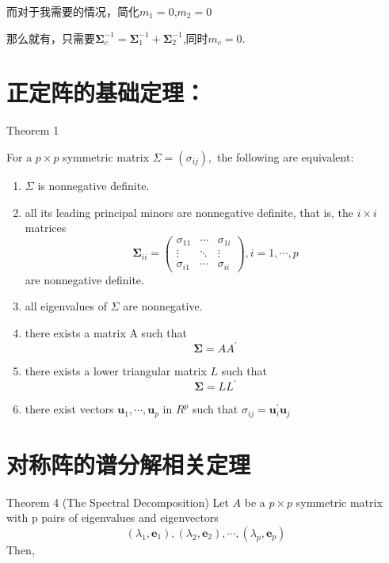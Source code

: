 \documentclass[
]{book}
\theoremstyle{definition}
\theoremstyle{definition}
\theoremstyle{definition}
\theoremstyle{remark}
\begin{document}
而对于我需要的情况，简化\(m_1=0\),\(m_2=0\)

那么就有，只需要\(\mathbf{\Sigma}_{c}^{-1}=\mathbf{\Sigma}_{1}^{-1}+\mathbf{\Sigma}_{2}^{-1}\),同时\(m_c=0\).

\hypertarget{ux6b63ux5b9aux9635ux7684ux57faux7840ux5b9aux7406}{%
\section{正定阵的基础定理：}\label{ux6b63ux5b9aux9635ux7684ux57faux7840ux5b9aux7406}}

Theorem 1

For a \(p \times p\) symmetric matrix \(\Sigma=\left(\sigma_{i j}\right),\) the following are equivalent:

\begin{enumerate}
\def\labelenumi{(\alph{enumi})}
\item
  \(\Sigma\) is nonnegative definite.
\item
  all its leading principal minors are nonnegative definite, that is, the \(i \times i\) matrices
  \[
  \boldsymbol{\Sigma}_{i i}=\left(\begin{array}{ccc}
  {\sigma_{11}} & {\cdots} & {\sigma_{1 i}} \\
  {\vdots} & {\ddots} & {\vdots} \\
  {\sigma_{i 1}} & {\cdots} & {\sigma_{i i}}
  \end{array}\right), i=1, \cdots, p
  \]
  are nonnegative definite.
\item
  all eigenvalues of \(\Sigma\) are nonnegative.
\item
  there exists a matrix A such that
  \[
  \boldsymbol{\Sigma}=A A^{\prime}
  \]
\item
  there exists a lower triangular matrix \(L\) such that
  \[
  \boldsymbol{\Sigma}=L L^{\prime}
  \]
\item
  there exist vectors \(\boldsymbol{u}_{1}, \cdots, \boldsymbol{u}_{p}\) in \(R^{p}\) such that \(\sigma_{i j}=\boldsymbol{u}_{i}^{\prime} \boldsymbol{u}_{j}\)
\end{enumerate}

\hypertarget{ux5bf9ux79f0ux9635ux7684ux8c31ux5206ux89e3ux76f8ux5173ux5b9aux7406}{%
\section{对称阵的谱分解相关定理}\label{ux5bf9ux79f0ux9635ux7684ux8c31ux5206ux89e3ux76f8ux5173ux5b9aux7406}}

Theorem 4 (The Spectral Decomposition) Let \(A\) be a \(p \times p\) symmetric matrix with p pairs of eigenvalues and eigenvectors
\[
\left(\lambda_{1}, \mathbf{e}_{1}\right),\left(\lambda_{2}, \mathbf{e}_{2}\right), \cdots,\left(\lambda_{p}, \mathbf{e}_{p}\right)
\]
Then,
\end{document}
